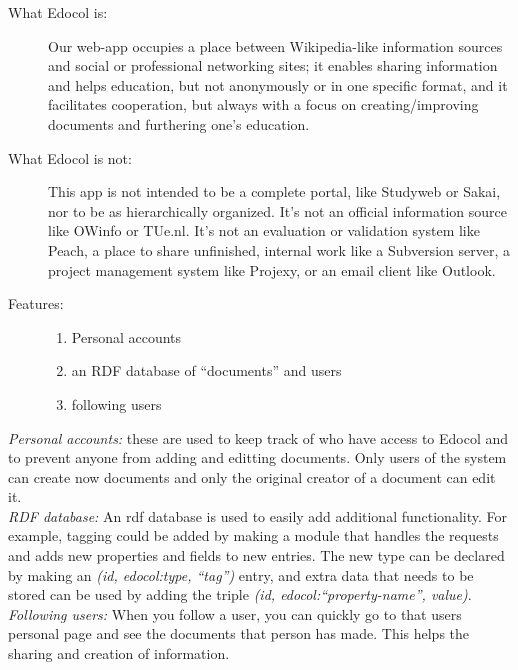 \documentclass[12pt,a4paper]{article}
\begin{document}
    \begin{description}
      \item[What Edocol is:] Our web-app occupies a place between Wikipedia-like 
      information sources and social or professional networking sites; 
      it enables sharing information and helps education, but not anonymously or 
      in one specific format, and it facilitates cooperation, but always with a 
      focus on creating/improving documents and furthering one's education.
      \item[What Edocol is not:] This app is not intended to be a complete portal, 
      like Studyweb or Sakai, nor to be as hierarchically organized. It's not an 
      official information source like OWinfo or TUe.nl. It's not an evaluation 
      or validation system like Peach, a place to share unfinished, internal work 
      like a Subversion server, a project management system like Projexy, or an 
      email client like Outlook.
      \item[Features:]
      \begin{enumerate}
        \item Personal accounts
        \item an RDF database of ``documents'' and users
        \item following users
      \end{enumerate}
    \end{description}
    
    \emph{Personal accounts:} these are used to keep track of who have access to
    Edocol and to prevent anyone from adding and editting documents. Only users
    of the system can create now documents and only the original creator of a 
    document can edit it.\\
    \emph{RDF database:} An rdf database is used to easily add additional functionality.
    For example, tagging could be added by making a module that handles the requests and
    adds new properties and fields to new entries. The new type can be declared by 
    making an \emph{(id, edocol:type, ``tag'')} entry, and extra data that needs
    to be stored can be used by adding the triple \emph{(id, edocol:``property-name'', value)}.\\
    \emph{Following users:} When you follow a user, you can quickly go to that users
    personal page and see the documents that person has made. This helps the sharing
    and creation of information.\\
    
\end{document}
